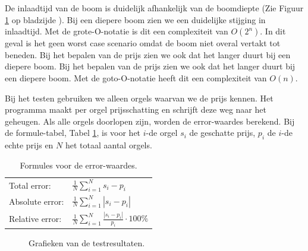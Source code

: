 \newpage

De inlaadtijd van de boom is duidelijk afhankelijk van de boomdiepte (Zie Figuur \ref{fig:test_results} op bladzijde \pageref{fig:test_results}). Bij een diepere boom zien we een duidelijke stijging in inlaadtijd. Met de grote-O-notatie is dit een complexiteit van $ O({2^n}) $. In dit geval is het geen worst case scenario omdat de boom niet overal vertakt tot beneden. Bij het bepalen van de prijs zien we ook dat het langer duurt bij een diepere boom.
Bij het bepalen van de prijs zien we ook dat het langer duurt bij een diepere boom. Met de goto-O-notatie heeft dit een complexiteit van $ O({n}) $.

Bij het testen gebruiken we alleen orgels waarvan we de prijs kennen. Het programma maakt per orgel prijsschatting en schrijft deze weg naar het geheugen. Als alle orgels doorlopen zijn, worden de error-waardes berekend. Bij de formule-tabel, Tabel \ref{tab:error_formulas}, is voor het \(i\)-de orgel \(s_i\) de geschatte prijs, \(p_i\) de \(i\)-de echte prijs en \(N\) het totaal aantal orgels.

\begin{table}[ht]
    \centering
    \begin{tabular}{ll}
        Total error: & \(\displaystyle\frac{1}{N}\sum_{i=1}^{N} s_i - p_i\)\\
        Absolute error: & \(\displaystyle\frac{1}{N}\sum_{i=1}^{N} |s_i - p_i|\)\\
        Relative error: & \(\displaystyle\frac{1}{N}\sum_{i=1}^{N}\frac{|s_i - p_i|}{p_i}\cdot 100\%\)\\

    \end{tabular}
    \caption{Formules voor de error-waardes.}
    \label{tab:error_formulas}
\end{table}

\begin{figure}[ht]
    \centering


    \caption{Grafieken van de testresultaten.}
    \label{fig:test_results}
\end{figure}


